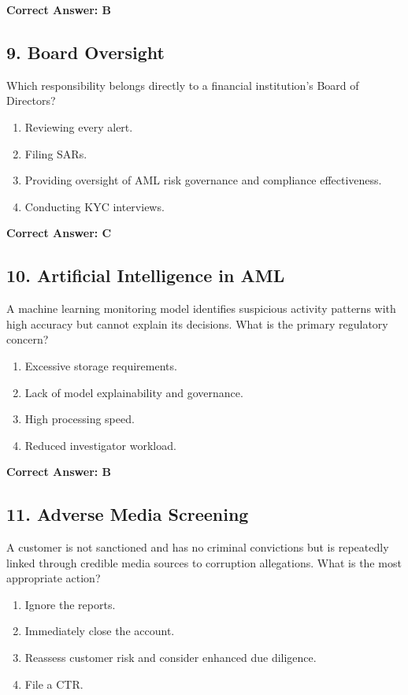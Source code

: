 \documentclass[11pt,a4paper]{article}
\begin{document}
	\textbf{Correct Answer: B}
	
	\subsection{9. Board Oversight}
	
	Which responsibility belongs directly to a financial institution's Board of Directors?
	
	\begin{enumerate}[label=\Alph*.]
		\item Reviewing every alert.
		\item Filing SARs.
		\item Providing oversight of AML risk governance and compliance effectiveness.
		\item Conducting KYC interviews.
	\end{enumerate}
	
	\textbf{Correct Answer: C}
	
	\subsection{10. Artificial Intelligence in AML}
	
	A machine learning monitoring model identifies suspicious activity patterns with high accuracy but cannot explain its decisions. What is the primary regulatory concern?
	
	\begin{enumerate}[label=\Alph*.]
		\item Excessive storage requirements.
		\item Lack of model explainability and governance.
		\item High processing speed.
		\item Reduced investigator workload.
	\end{enumerate}
	
	\textbf{Correct Answer: B}
	
	\subsection{11. Adverse Media Screening}
	
	A customer is not sanctioned and has no criminal convictions but is repeatedly linked through credible media sources to corruption allegations. What is the most appropriate action?
	
	\begin{enumerate}[label=\Alph*.]
		\item Ignore the reports.
		\item Immediately close the account.
		\item Reassess customer risk and consider enhanced due diligence.
		\item File a CTR.
	\end{enumerate}
	
\end{document}
